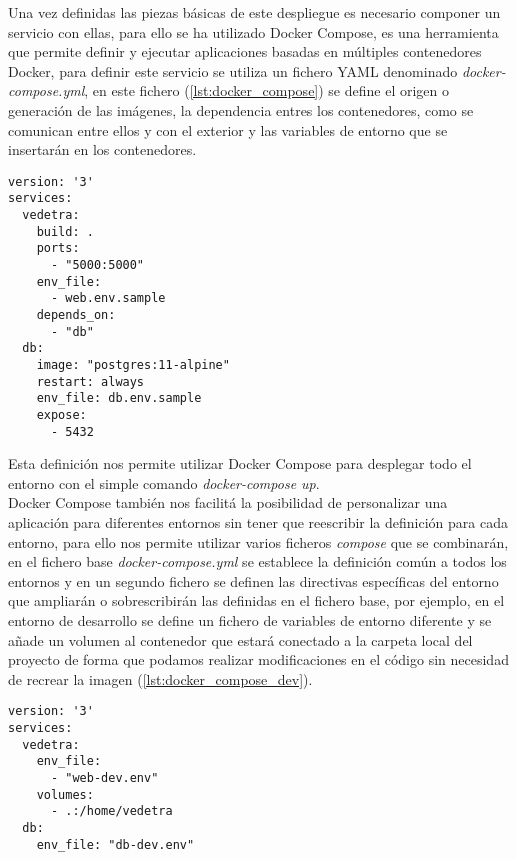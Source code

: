 \documentclass[../proyecto.tex]{subfiles}
\begin{document}
Una vez definidas las piezas básicas de este despliegue es necesario componer un servicio con ellas, para ello se ha utilizado Docker Compose, es una herramienta que permite definir y ejecutar aplicaciones basadas en múltiples contenedores Docker, para definir este servicio se utiliza un fichero YAML denominado \textit{docker-compose.yml}, en este fichero (\autoref{lst:docker_compose}) se define el origen o generación de las imágenes, la dependencia entres los contenedores, como se comunican entre ellos y con el exterior y las variables de entorno que se insertarán en los contenedores. \\

\begin{lstlisting}[caption=Fichero docker-compose.yml base, captionpos=b, frame=single, label={lst:docker_compose}]
version: '3'
services:
  vedetra:
    build: .
    ports:
      - "5000:5000"
    env_file:
      - web.env.sample
    depends_on:
      - "db"
  db:
    image: "postgres:11-alpine"
    restart: always
    env_file: db.env.sample
    expose:
      - 5432
\end{lstlisting}

Esta definición nos permite utilizar Docker Compose para desplegar todo el entorno con el simple comando \textit{docker-compose up}.\\

Docker Compose también nos facilitá la posibilidad de personalizar una aplicación para diferentes entornos sin tener que reescribir la definición para cada entorno, para ello nos permite utilizar varios ficheros \textit{compose} que se combinarán, en el fichero base \textit{docker-compose.yml} se establece la definición común a todos los entornos y en un segundo fichero se definen las directivas específicas del entorno que ampliarán o sobrescribirán las definidas en el fichero base, por ejemplo, en el entorno de desarrollo se define un fichero de variables de entorno diferente y se añade un volumen al contenedor que estará conectado a la carpeta local del proyecto de forma que podamos realizar modificaciones en el código sin necesidad de recrear la imagen (\autoref{lst:docker_compose_dev}).\\

\begin{minipage}{\linewidth}
\begin{lstlisting}[caption=Fichero docker-compose.yml para el entorno de desarrollo, captionpos=b, frame=single, label={lst:docker_compose_dev}]
version: '3'
services:
  vedetra:
    env_file:
      - "web-dev.env"
    volumes:
      - .:/home/vedetra
  db:
    env_file: "db-dev.env"
\end{lstlisting}
\end{minipage}
\end{document}
